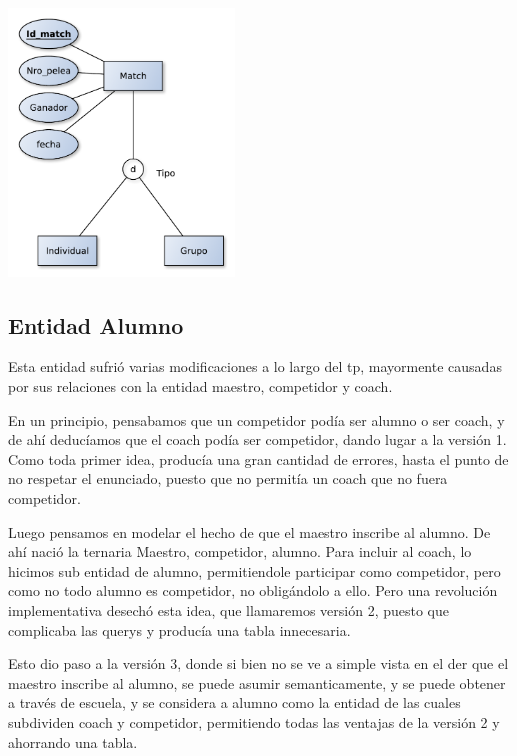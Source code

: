 \begin{center}
\includegraphics[width=6cm,keepaspectratio]{./imagenes/des2.pdf}\newline
\end{center}

\subsection{Entidad Alumno}

Esta entidad sufri\'o varias modificaciones a lo largo del tp, mayormente causadas por sus relaciones con la entidad maestro, competidor y coach.

En un principio, pensabamos que un competidor podía ser alumno o ser coach, y de ahí deducíamos que el coach podía ser competidor, dando lugar a la versión 1. Como toda primer idea, producía una gran cantidad de errores, hasta el punto de no respetar el enunciado, puesto que no permitía un coach que no fuera competidor. 

Luego pensamos en modelar el hecho de que el maestro inscribe al alumno. De ahí nació la ternaria Maestro, competidor, alumno. Para incluir al coach, lo hicimos sub entidad de alumno, permitiendole participar como competidor, pero como no todo alumno es competidor, no oblig\'andolo a ello. Pero una revolución implementativa desechó esta idea, que llamaremos versión 2, puesto que complicaba las querys y producía una tabla innecesaria.

Esto dio paso a la versión 3, donde si bien no se ve a simple vista en el der que el maestro inscribe al alumno, se puede asumir semanticamente, y se puede obtener a través de escuela, y se considera a alumno como la entidad de las cuales subdividen coach y competidor, permitiendo todas las ventajas de la versión 2 y ahorrando una tabla.

